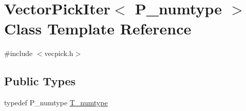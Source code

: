 \hypertarget{classVectorPickIter}{}\section{Vector\+Pick\+Iter$<$ P\+\_\+numtype $>$ Class Template Reference}
\label{classVectorPickIter}


{\ttfamily \#include $<$vecpick.\+h$>$}

\subsection*{Public Types}
\begin{DoxyCompactItemize}
\item 
typedef P\+\_\+numtype \hyperlink{classVectorPickIter_a105b4687faac1a8a5ee37bdec8163f92}{T\+\_\+numtype}
\end{DoxyCompactItemize}

